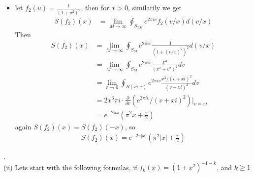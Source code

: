 \documentclass[pdf]{article}
\begin{document}
\begin{itemize}
\item let $f_2(u)=\frac{1}{(1+u^2)^2}$, then for $x>0$, similarily we get
\begin{align}\label{Question7integral}
S(f_2)(x) &= \lim\limits_{M\to\infty}\oint_{S_{xM}}e^{2\pi iv}f_2(v/x)d(v/x)
\end{align}
Then
\begin{align*}
S(f_2)(x) &= \lim\limits_{M\to\infty}\oint_{S_{M}}e^{2\pi iv}\frac{1}{(1+(v/x)^2)^2}d(v/x)\\
                &= \lim\limits_{M\to\infty}\oint_{S_{M}}e^{2\pi iv}\frac{x^3}{(x^2+v^2)^2}dv\\
                &= \lim\limits_{r\to0}\oint_{B(xi, r)}e^{2\pi iv}\frac{x^3/(v+xi)^2}{(v-xi)^2}dv\\
                &= 2x^3\pi i\cdot \frac{\partial}{\partial v}(e^{2\pi iv}/(v+xi)^2)|_{v=xi}\\
                &= e^{-2\pi x}(\pi^2x+\frac{\pi}{2})
\end{align*}
again $S(f_2)(x) = S(f_2)(-x)$, so
\begin{align*}
S(f_2)(x) = e^{-2\pi |x|}(\pi^2|x|+\frac{\pi}{2})
\end{align*}

\end{itemize}
.\\
(ii) Lets start with the following formulas, if $f_k(x) = (1+x^2)^{-1-k}$, and $k\geq 1$
\end{document}

